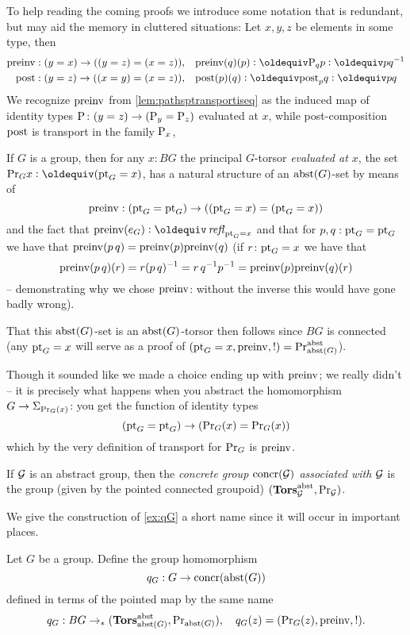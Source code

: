 To help reading the coming proofs we introduce some notation that is redundant, but may aid the memory in cluttered situations:  Let $x,y,z$ be elements in some type, then
\begin{align*}
  \preinv:(y=x)\to ((y=z)=(x=z)),\quad&\preinv(q)(p)\defequi\pathsp qp\defequi pq^{-1}\\
  \post:(y=z)\to ((x=y)=(x=z)),\quad&\post(p)(q)\defequi\post_pq\defequi pq\\
\end{align*}
We recognize $\mathrm{preinv}$ from \cref{lem:pathsptransportiseq} as the induced map of identity types $\mathrm{P}_{}\colon (y=z)\to(\mathrm{P}_{y}=\mathrm{P}_{z})$ evaluated at $x$, while post-composition $\mathrm{post}$ is transport in the family $\mathrm{P}_{x}$, 


\begin{example}\label{ex:qG}
  If $G$ is a group, then for any $x:BG$ the principal $G$-torsor \emph{evaluated at $x$}, \ie the set $\princ Gx\defequi(\pt_G=x)$, has a natural structure of an $\mathrm{abst}(G)$-set by means of 
$$\mathrm{preinv}:({\mathord{\mathrm{pt}}}_G={\mathord{\mathrm{pt}}}_G)\to (({\mathord{\mathrm{pt}}}_G=x)=({\mathord{\mathrm{pt}}}_G=x))$$ and the fact that $\preinv(e_G)\defequi\refl{\pt_G=x}$ and that for $p,q:{\mathord{\mathrm{pt}}}_G={\mathord{\mathrm{pt}}}_G$ we have that  $\mathrm{preinv}(p\,q)=\mathrm{preinv}(p)\mathrm{preinv}(q)$ (\ie if $r\colon {\mathord{\mathrm{pt}}}_G=x$ we have that 
$$\mathrm{preinv}(p\, q)(r)=r(p\,q)^{-1}=r\,q^{-1}p^{-1}=\mathrm{preinv}(p)\mathrm{preinv}(q)(r)$$  -- demonstrating why we chose $\mathrm{preinv}$: without the inverse this would have gone badly wrong).  

That this $\mathrm{abst}(G)$-set is an $\mathrm{abst}(G)$-torsor then follows since $BG$ is connected (any ${\mathord{\mathrm{pt}}}_G=x$ will serve as a proof of $({\mathord{\mathrm{pt}}}_G=x,\mathrm{preinv},!)=\mathrm{Pr}_{{\mathrm{abst}(G)}}^{\mathrm{abst}}$).

Though it sounded like we made a choice ending up with $\mathrm{preinv}$; we really didn't -- it is precisely what happens when you abstract the homomorphism $G\to\Sigma_{\mathrm{Pr}_{{G}}(x)}$: 
you get the function of identity types 
$$({\mathord{\mathrm{pt}}}_G={\mathord{\mathrm{pt}}}_G)\to (\mathrm{Pr}_{{G}}(x)=\mathrm{Pr}_{{G}}(x))$$ 
which by the very definition of transport for $\mathrm{Pr}_{{G}}$ is $\mathrm{preinv}$. 
\end{example}

\begin{definition}
  If ${\mathcal G}$ is an abstract group, then the \emph{concrete group $\mathrm{concr}({\mathcal G})$ associated with ${\mathcal G}$} is the group (given by the pointed connected groupoid) $(\mathbf{Tors}_{\mathcal G}^{\mathrm{abst}},\mathrm{Pr}_{{\mathcal G}})$.
\end{definition}
We give the construction of \cref{ex:qG} a short name since it will occur in important places.
\begin{definition}
  Let $G$ be a group.  Define the group homomorphism 
 $$q_G:G\to \mathrm{concr}(\mathrm{abst}(G))$$ defined in terms of the pointed map by the same name
$$q_G:BG\to_* (\mathbf{Tors}^{\mathrm{abst}}_{\mathrm{abst}(G)},\mathrm{Pr}_{{\mathrm{abst}(G)}}),\quad q_G(z)=(\mathrm{Pr}_{{G}}(z),\mathrm{preinv},!).$$
\end{definition}


